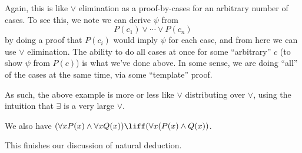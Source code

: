 \begin{remark}
	Again, this is like $\lor$ elimination as a proof-by-cases for an arbitrary number of cases. To see this, we note we can derive $\psi$ from
	\[P(c_1)\lor\cdots\lor P(c_n)\]
	by doing a proof that $P(c_i)$ would imply $\psi$ for each case, and from here we can use $\lor$ elimination. The ability to do all cases at once for some ``arbitrary'' $c$ (to show $\psi$ from $P(c)$) is what we've done above. In some sense, we are doing ``all'' of the cases at the same time, via some ``template'' proof.
\end{remark}
\begin{remark}
	As such, the above example is more or less like $\lor$ distributing over $\lor$, using the intuition that $\exists$ is a very large $\lor$.
\end{remark}
\begin{remark}
	We also have $(\forall xP(x)\land\forall xQ(x))\liff(\forall x(P(x)\land Q(x))$.
\end{remark}
This finishes our discussion of natural deduction.
